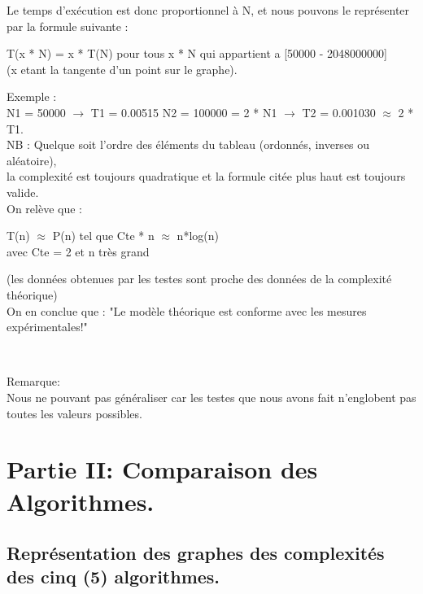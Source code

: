 \documentclass[12pt]{article}
\begin{document}
  Le temps d'exécution est donc proportionnel à N, et nous pouvons le représenter par la formule suivante : \\
 
\begin{center}

\color{red}
T(x * N) = x * T(N) pour tous x * N qui appartient a [50000 - 2048000000]\\
\color{black}
(x etant la tangente d'un point sur le graphe).\\

\end{center}

  Exemple : \\
  N1 = 50000 $\rightarrow$ T1 = 0.00515
  N2 = 100000 = 2 * N1 $\rightarrow$ T2 = 0.001030 $\approx$ 2 * T1.\\

  NB : Quelque soit l'ordre des éléments du tableau \color{blue} (ordonnés, inverses ou aléatoire)\color{black},\\
  la complexité est toujours quadratique et la formule citée plus haut est toujours valide.\\

On relève que :
\begin{center}
\color{blue} 
 T(n) $\approx$ P(n) tel que Cte * n $\approx$ n*log(n) \\
\color{black}
 avec Cte = 2 et n très grand\\
\end{center}

 (les données obtenues par les testes sont proche des données de la complexité théorique)\\
  
  On en conclue que :
\color{red}
 "Le modèle théorique est conforme avec les mesures expérimentales!"\\
\color{black}

\texttt{  }

\color{red}
Remarque:\\
\color{black}
Nous ne pouvant pas généraliser car les testes que nous avons fait n'englobent pas toutes les valeurs possibles.




\newpage


\section{Partie II: Comparaison des Algorithmes.}
\subsection{Représentation des graphes des complexités des cinq (5) algorithmes.}
\end{document}
